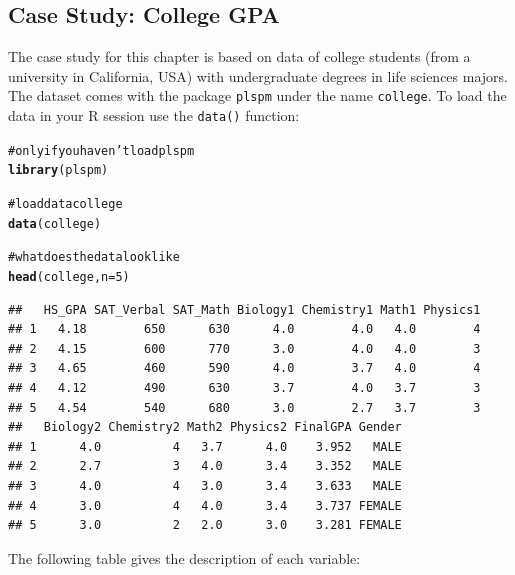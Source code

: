\documentclass[12pt]{book}\usepackage{graphicx, color}
\makeatletter
\newcommand{\hlfunctioncall}[1]{\textcolor[rgb]{0.501960784313725,0,0.329411764705882}{\textbf{#1}}}%
\newcommand{\hlcomment}[1]{\textcolor[rgb]{0.180392156862745,0.6,0.341176470588235}{#1}}%
\newenvironment{kframe}{%
 \def\at@end@of@kframe{}%
 \ifinner\ifhmode%
  \def\at@end@of@kframe{\end{minipage}}%
  \begin{minipage}{\columnwidth}%
 \fi\fi%
 \def\FrameCommand##1{\hskip\@totalleftmargin \hskip-\fboxsep
 \colorbox{shadecolor}{##1}\hskip-\fboxsep
     \hskip-\linewidth \hskip-\@totalleftmargin \hskip\columnwidth}%
 \MakeFramed {\advance\hsize-\width
   \@totalleftmargin\z@ \linewidth\hsize
   \@setminipage}}%
 {\par\unskip\endMakeFramed%
 \at@end@of@kframe}
\newenvironment{knitrout}{}{} %
\newcommand{\plspm}{\texttt{plspm}}
\newcommand{\code}[1]{\texttt{#1}}
\makeatother
\begin{document}
\subsection{Case Study: College GPA}
The case study for this chapter is based on data of college students (from a university in California, USA) with undergraduate degrees in life sciences majors. The dataset comes with the package \plspm{} under the name \code{college}. To load the data in your R session use the \code{data()} function:
\begin{knitrout}\small
{}\color{fgcolor}\begin{kframe}
\begin{alltt}
\hlcomment{# only if you haven't load plspm}
\hlfunctioncall{library}(plspm)

\hlcomment{# load data college}
\hlfunctioncall{data}(college)

\hlcomment{# what does the data look like}
\hlfunctioncall{head}(college, n = 5)
\end{alltt}
\begin{verbatim}
##   HS_GPA SAT_Verbal SAT_Math Biology1 Chemistry1 Math1 Physics1
## 1   4.18        650      630      4.0        4.0   4.0        4
## 2   4.15        600      770      3.0        4.0   4.0        3
## 3   4.65        460      590      4.0        3.7   4.0        4
## 4   4.12        490      630      3.7        4.0   3.7        3
## 5   4.54        540      680      3.0        2.7   3.7        3
##   Biology2 Chemistry2 Math2 Physics2 FinalGPA Gender
## 1      4.0          4   3.7      4.0    3.952   MALE
## 2      2.7          3   4.0      3.4    3.352   MALE
## 3      4.0          4   3.0      3.4    3.633   MALE
## 4      3.0          4   4.0      3.4    3.737 FEMALE
## 5      3.0          2   2.0      3.0    3.281 FEMALE
\end{verbatim}
\end{kframe}
\end{knitrout}


The following table gives the description of each variable:
\end{document}
